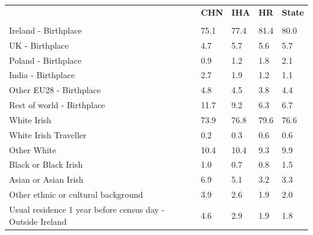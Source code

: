 \documentclass{article}
\begin{document}
\pagebreak
\begin{table}[h]	
\centering
		\begin{tabular}{KTTTT}
  \hline
& \textbf{CHN} & \textbf{IHA} & \textbf{HR}& \textbf{State}\\ 
  \hline
    \\ 
    \hline
Ireland - Birthplace & 75.1& 77.4& 81.4& 80.0\\
UK - Birthplace & 4.7& 5.7& 5.6& 5.7\\
Poland - Birthplace & 0.9& 1.2& 1.8& 2.1\\
India - Birthplace & 2.7& 1.9& 1.2& 1.1\\
Other EU28 - Birthplace & 4.8& 4.5& 3.8& 4.4\\
Rest of world - Birthplace & 11.7&  9.2&  6.3&  6.7\\
    \hline
White Irish & 73.9& 76.8& 79.6& 76.6\\
White Irish Traveller & 0.2& 0.3& 0.6& 0.6\\
Other White & 10.4& 10.4&  9.3&  9.9\\
Black or Black Irish & 1.0& 0.7& 0.8& 1.5\\
Asian or Asian Irish & 6.9& 5.1& 3.2& 3.3\\
Other ethnic or cultural background & 3.9& 2.6& 1.9& 2.0\\
    \hline
Usual residence 1 year before census day - Outside Ireland & 4.6& 2.9& 1.9& 1.8\\


\end{tabular}
\end{table}
\end{document}
